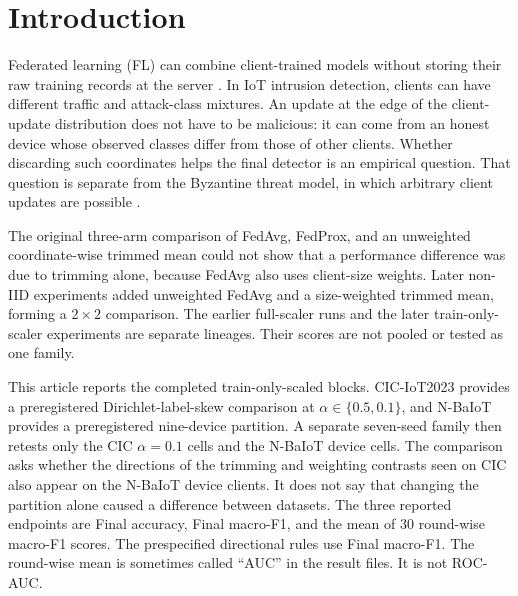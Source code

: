 \documentclass{ieeeaccess}
\begin{document}
\maketitle

\section{Introduction}
Federated learning (FL) can combine client-trained models without storing their raw training records at the server \cite{mcmahan17}. In IoT intrusion detection, clients can have different traffic and attack-class mixtures. An update at the edge of the client-update distribution does not have to be malicious: it can come from an honest device whose observed classes differ from those of other clients. Whether discarding such coordinates helps the final detector is an empirical question. That question is separate from the Byzantine threat model, in which arbitrary client updates are possible \cite{yin18}.

The original three-arm comparison of FedAvg, FedProx, and an unweighted coordinate-wise trimmed mean could not show that a performance difference was due to trimming alone, because FedAvg also uses client-size weights. Later non-IID experiments added unweighted FedAvg and a size-weighted trimmed mean, forming a $2\times2$ comparison. The earlier full-scaler runs and the later train-only-scaler experiments are separate lineages. Their scores are not pooled or tested as one family.

This article reports the completed train-only-scaled blocks. CIC-IoT2023 provides a preregistered Dirichlet-label-skew comparison at $\alpha\in\{0.5,0.1\}$, and N-BaIoT provides a preregistered nine-device partition. A separate seven-seed family then retests only the CIC $\alpha=0.1$ cells and the N-BaIoT device cells. The comparison asks whether the directions of the trimming and weighting contrasts seen on CIC also appear on the N-BaIoT device clients. It does not say that changing the partition alone caused a difference between datasets. The three reported endpoints are Final accuracy, Final macro-F1, and the mean of 30 round-wise macro-F1 scores. The prespecified directional rules use Final macro-F1. The round-wise mean is sometimes called ``AUC'' in the result files. It is not ROC-AUC.
\end{document}
